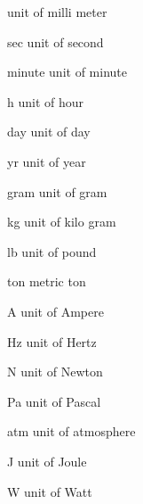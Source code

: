 \begin{datadesc}{mm}
  unit of milli meter
\end{datadesc}

\begin{datadesc}{sec}
 unit of second
\end{datadesc}

\begin{datadesc}{minute}
  unit of minute
\end{datadesc}

\begin{datadesc}{h}
unit of hour 
\end{datadesc}
\begin{datadesc}{day}
unit of day 
\end{datadesc}
\begin{datadesc}{yr}
 unit of year
\end{datadesc}

\begin{datadesc}{gram}
unit of gram
\end{datadesc}
\begin{datadesc}{kg}
unit of kilo gram
 \end{datadesc}
\begin{datadesc}{lb}
unit of pound 
\end{datadesc}
\begin{datadesc}{ton}
 metric ton
\end{datadesc}

\begin{datadesc}{A}
 unit of Ampere
\end{datadesc}

\begin{datadesc}{Hz}
 unit of Hertz
\end{datadesc}

\begin{datadesc}{N}
 unit of Newton
\end{datadesc}
\begin{datadesc}{Pa}
unit of Pascal 
\end{datadesc}
\begin{datadesc}{atm}
unit of atmosphere 
\end{datadesc}
\begin{datadesc}{J}
unit of Joule 
\end{datadesc}

\begin{datadesc}{W}
unit of Watt 
\end{datadesc}

